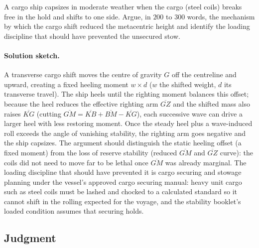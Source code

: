 \begin{exercise}
A cargo ship capsizes in moderate weather when the cargo (steel
coils) breaks free in the hold and shifts to one side. Argue, in
$200$ to $300$ words, the mechanism by which the cargo shift
reduced the metacentric height and identify the loading
discipline that should have prevented the unsecured stow.

\paragraph{Solution sketch.} A transverse cargo shift moves the centre
of gravity $G$ off the centreline and upward, creating a fixed heeling
moment $w \times d$ ($w$ the shifted weight, $d$ its transverse travel).
The ship heels until the righting moment balances this offset; because
the heel reduces the effective righting arm $\overline{GZ}$ and the
shifted mass also raises $\overline{KG}$ (cutting $\overline{GM} =
\overline{KB} + \overline{BM} - \overline{KG}$), each successive wave can
drive a larger heel with less restoring moment. Once the steady heel
plus a wave-induced roll exceeds the angle of vanishing stability, the
righting arm goes negative and the ship capsizes. The argument should
distinguish the static heeling offset (a fixed moment) from the loss of
reserve stability (reduced $\overline{GM}$ and $\overline{GZ}$ curve):
the coils did not need to move far to be lethal once $\overline{GM}$ was
already marginal. The loading discipline that should have prevented it is
cargo securing and stowage planning under the vessel's approved cargo
securing manual: heavy unit cargo such as steel coils must be lashed and
chocked to a calculated standard so it cannot shift in the rolling
expected for the voyage, and the stability booklet's loaded condition
assumes that securing holds.
\end{exercise}

\subsection*{Judgment}

